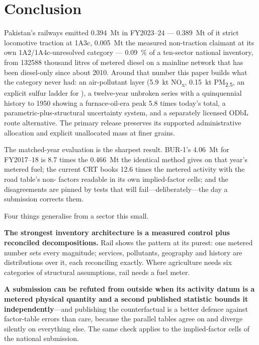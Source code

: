 \section{Conclusion}
\label{sec:conclusion}

Pakistan's railways emitted \SI{0.394}{\mega\tonne} \COe{} in FY2023--24 ---
\SI{0.389}{\mega\tonne} of it strict locomotive traction at 1A3c, \SI{0.005}{\mega\tonne}
the measured non-traction claimant at its own 1A2/1A4c-unresolved category ---
\SI{0.09}{\percent} of a ten-sector national inventory, from \num{132588} thousand litres
of metered diesel on a mainline network that has been diesel-only since about 2010. Around
that number this paper builds what the category never had: an air-pollutant layer
(\SI{5.9}{\kilo\tonne} NO\textsubscript{x}, \SI{0.15}{\kilo\tonne} PM\textsubscript{2.5},
an explicit sulfur ladder for \SOtwo{}), a twelve-year unbroken series with a
quinquennial history to 1950 showing a furnace-oil-era peak \num{5.8} times today's total, a
parametric-plus-structural uncertainty system, and a separately licensed ODbL route alternative. The primary release preserves its supported administrative allocation and explicit unallocated mass at finer grains.

The matched-year evaluation is the sharpest result. BUR-1's \SI{4.06}{\mega\tonne} for
FY2017--18 is \num{8.7} times the \SI{0.466}{\mega\tonne} the identical method gives on
that year's metered fuel; the current CRT books \num{12.6} times the metered activity with the
road table's non-\COtwo{} factors readable in its own implied-factor cells; and the
disagreements are pinned by tests that will fail---deliberately---the day a submission
corrects them.

Four things generalise from a sector this small.

\textbf{The strongest inventory architecture is a measured control plus reconciled
decompositions.} Rail shows the pattern at its purest: one metered number sets every
magnitude; services, pollutants, geography and history are distributions over it, each
reconciling exactly. Where agriculture needs six categories of structural assumptions,
rail needs a fuel meter.

\textbf{A submission can be refuted from outside when its activity datum is a metered
physical quantity and a second published statistic bounds it independently}---and
publishing the counterfactual is a better defence against factor-table errors than care,
because the parallel tables agree on \COtwo{} and diverge silently on everything else.
The same check applies to the implied-factor cells of the national submission.

